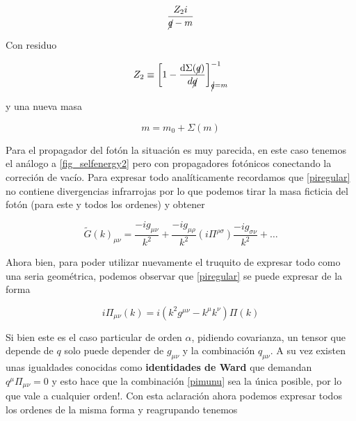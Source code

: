 \documentclass[tickz]{article}
\numberwithin{equation}{section}
\begin{document}
\begin{equation}\label{key}
\frac{Z_2 i}{\cancel{q}-m}
\end{equation}

Con residuo

\begin{equation}\label{z2}
Z_2 \equiv \left[ 1 -\frac{\mathrm{d}\Sigma(\cancel{q})}{d\cancel{q}}\right]^{-1}_{\cancel{q}=m}
\end{equation}

y una nueva masa

\begin{equation}\label{m}
m = m_0 +\Sigma(m)
\end{equation}

\vspace{2cm}

Para el propagador del fotón la situación es muy parecida, en este caso tenemos el análogo a \ref{fig_selfenergy2} pero con propagadores fotónicos conectando la correción de vacío. Para expresar todo analíticamente recordamos que \ref{piregular} no contiene divergencias infrarrojas por lo que podemos tirar la masa ficticia del fotón (para este y todos los ordenes) y obtener

\begin{equation}\label{key}
\widetilde{G}(k)_{\mu\nu} = \frac{-i g_{\mu\nu}}{k^2} + \frac{-i g_{\mu\rho}}{k^2}\left(i\Pi^{\rho\sigma}\right)\frac{-i g_{\sigma\nu}}{k^2} + \dots 
\end{equation}

Ahora bien, para poder utilizar nuevamente el truquito de expresar todo como una seria geométrica, podemos observar que \ref{piregular} se puede expresar de la forma

\begin{equation}\label{pimunu}
i\Pi_{\mu\nu}(k) =i\left(k^2g^{\mu\nu} - k^{\mu}k^{\nu}\right) \Pi(k)
\end{equation}

Si bien este es el caso particular de orden $ \alpha $, pidiendo covarianza, un tensor que depende de $ q $ solo puede depender de $ g_{\mu\nu} $ y la combinación $ q_{\mu\nu} $. A su vez existen unas igualdades conocidas como \textbf{identidades de Ward} que demandan $ q^{\mu}\Pi_{\mu\nu}=0 $ y esto hace que la combinación \ref{pimunu} sea la única posible, por lo que vale a cualquier orden!. Con esta aclaración ahora podemos expresar todos los ordenes de la misma forma y reagrupando tenemos
\end{document}
